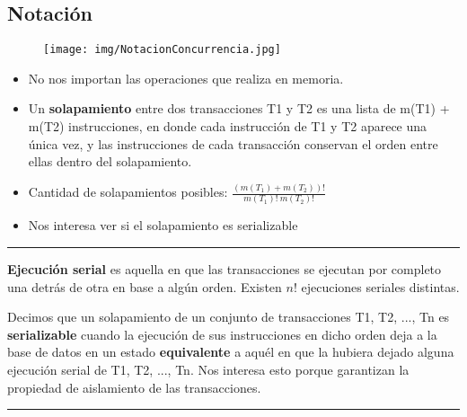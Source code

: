 \subsection*{Notación}

\begin{figure}[!htb]
    \centering
    \texttt{[image: img/NotacionConcurrencia.jpg]}
\end{figure}

\begin{itemize}
\item No nos importan las operaciones que realiza en memoria.
\item Un \textbf{solapamiento} entre dos transacciones T1 y T2 es una lista de m(T1) + m(T2) instrucciones, en donde cada instrucción de T1 y T2 aparece una única vez, y las instrucciones de cada transacción conservan el orden entre ellas dentro del solapamiento.
\item Cantidad de solapamientos posibles: $ \frac{(m(T_1) + m(T_2))!}{m(T_1)!\ m(T_2)!}$
\item Nos interesa ver si el solapamiento es serializable
\end{itemize}


\noindent\rule{\textwidth}{0.5pt}

\textbf{Ejecución serial} es aquella en que las transacciones se ejecutan por completo una detrás de otra en base a algún orden. Existen $n!$ ejecuciones seriales distintas.

Decimos que un solapamiento de un conjunto de transacciones
T1, T2, ..., Tn es \textbf{serializable} cuando la ejecución de sus
instrucciones en dicho orden deja a la base de datos en un
estado \textbf{equivalente} a aquél en que la hubiera dejado alguna
ejecución serial de T1, T2, ..., Tn. Nos interesa esto porque garantizan la propiedad de aislamiento de las transacciones.

\noindent\rule{\textwidth}{0.5pt}

